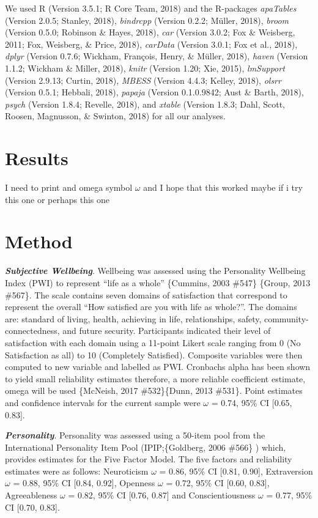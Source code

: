 \documentclass[man,floatsintext]{apa6}
\begin{document}
We used R (Version 3.5.1; R Core Team, 2018) and the R-packages
\emph{apaTables} (Version 2.0.5; Stanley, 2018), \emph{bindrcpp}
(Version 0.2.2; Müller, 2018), \emph{broom} (Version 0.5.0; Robinson \&
Hayes, 2018), \emph{car} (Version 3.0.2; Fox \& Weisberg, 2011; Fox,
Weisberg, \& Price, 2018), \emph{carData} (Version 3.0.1; Fox et al.,
2018), \emph{dplyr} (Version 0.7.6; Wickham, François, Henry, \& Müller,
2018), \emph{haven} (Version 1.1.2; Wickham \& Miller, 2018),
\emph{knitr} (Version 1.20; Xie, 2015), \emph{lmSupport} (Version
2.9.13; Curtin, 2018), \emph{MBESS} (Version 4.4.3; Kelley, 2018),
\emph{olsrr} (Version 0.5.1; Hebbali, 2018), \emph{papaja} (Version
0.1.0.9842; Aust \& Barth, 2018), \emph{psych} (Version 1.8.4; Revelle,
2018), and \emph{xtable} (Version 1.8.3; Dahl, Scott, Roosen, Magnusson,
\& Swinton, 2018) for all our analyses.

\section{Results}\label{results}

I need to print and omega symbol \(\omega\) and I hope that this worked
maybe if i try this one or perhaps this one

\section{Method}\label{method}

\textbf{\emph{Subjective Wellbeing}}. Wellbeing was assessed using the
Personality Wellbeing Index (PWI) to represent \enquote{life as a whole}
\{Cummins, 2003 \#547\} \{Group, 2013 \#567\}. The scale contains seven
domains of satisfaction that correspond to represent the overall
\enquote{How satisfied are you with life as whole?}. The domains are:
standard of living, health, achieving in life, relationships, safety,
community-connectedness, and future security. Participants indicated
their level of satisfaction with each domain using a 11-point Likert
scale ranging from 0 (No Satisfaction as all) to 10 (Completely
Satisfied). Composite variables were then computed to new variable and
labelled as PWI. Cronbachs alpha has been shown to yield small
reliability estimates therefore, a more reliable coefficient estimate,
omega will be used \{McNeish, 2017 \#532\}\{Dunn, 2013 \#531\}. Point
estimates and confidence intervals for the current sample were
\(\omega\) = 0.74, 95\% CI {[}0.65, 0.83{]}.

\textbf{\emph{Personality}}. Personality was assessed using a 50-item
pool from the International Personality Item Pool (IPIP;\{Goldberg, 2006
\#566\} ) which, provides estimates for the Five Factor Model. The five
factors and reliability estimates were as follows: Neuroticism
\(\omega\) = 0.86, 95\% CI {[}0.81, 0.90{]}, Extraversion \(\omega\) =
0.88, 95\% CI {[}0.84, 0.92{]}, Openness \(\omega\) = 0.72, 95\% CI
{[}0.60, 0.83{]}, Agreeableness \(\omega\) = 0.82, 95\% CI {[}0.76,
0.87{]} and Conscientiousness \(\omega\) = 0.77, 95\% CI {[}0.70,
0.83{]}.
\end{document}
